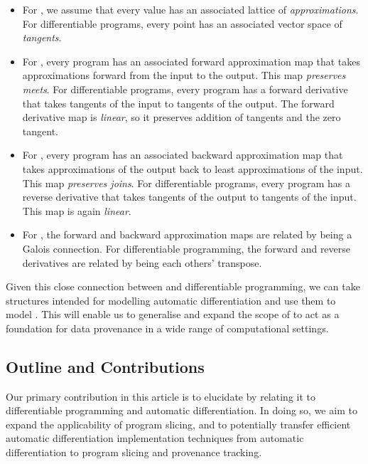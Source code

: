 \begin{itemize}
\item For \GPS, we assume that every value has an associated lattice of {\em approximations}. For differentiable programs, every point has an associated vector space of {\em tangents}.
\item For \GPS, every program has an associated forward approximation map that takes approximations forward from the input to the output. This map {\em preserves meets}. For differentiable programs, every program has a forward derivative that takes tangents of the input to tangents of the output. The forward derivative map is {\em linear}, so it preserves addition of tangents and the zero tangent.
\item For \GPS, every program has an associated backward approximation map that takes approximations of the output back to least approximations of the input. This map {\em preserves joins}. For differentiable programs, every program has a reverse derivative that takes tangents of the output to tangents of the input. This map is again {\em linear}.
\item For \GPS, the forward and backward approximation maps are related by being a Galois connection. For differentiable programming, the forward and reverse derivatives are related by being each others' transpose.
\end{itemize}

Given this close connection between \GPS and differentiable programming, we can take structures intended for modelling automatic differentiation and use them to model \GPS. This will enable us to generalise and expand the scope of \GPS to act as a foundation for data provenance in a wide range of computational settings.

\subsection{Outline and Contributions}

Our primary contribution in this article is to elucidate \GPS by relating it to differentiable programming and automatic differentiation. In doing so, we aim to expand the applicability of program slicing, and to potentially transfer efficient automatic differentiation implementation techniques from automatic differentiation to program slicing and provenance tracking.

